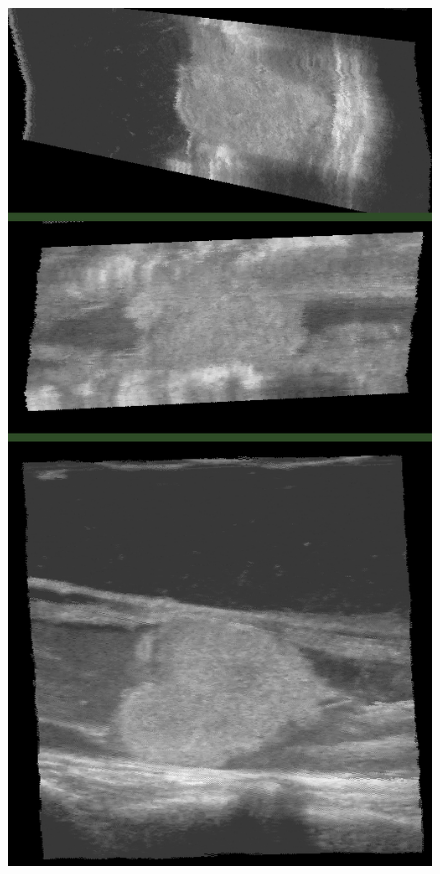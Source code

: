 \begin{figure}
\begin{minipage}[b]{0.326\textwidth}
	\label{fig:large_pnn}
\end{minipage}
\hspace{0.01\textwidth}
\begin{minipage}[b]{0.326\textwidth}
	\centering
	\includegraphics[width=\textwidth]{graphics/large_vnn.png}

\end{minipage}
\end{figure}
